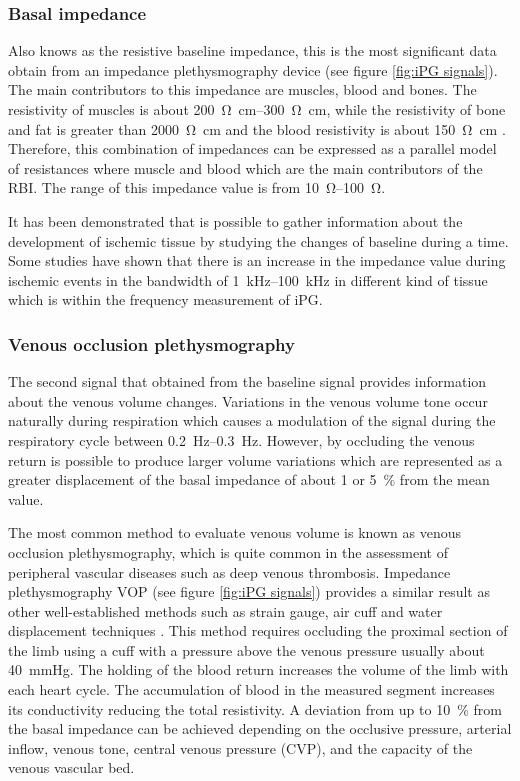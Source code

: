 \subsubsection{Basal impedance}
Also knows as the resistive baseline impedance, this is the most significant data obtain from an impedance plethysmography device (see figure \ref{fig:iPG signals}). The main contributors to this impedance are muscles, blood and bones. The resistivity of muscles is about \SIrange{200}{300}{\ohm\cm}, while the resistivity of bone and fat is greater than \SI{2000}{\ohm\cm} and the blood resistivity is about \SI{150}{\ohm\cm} \cite{gabriel1996dielectric}. Therefore, this combination of impedances can be expressed as a parallel model of resistances where muscle and blood which are the main contributors of the RBI. The range of this impedance value is from \SIrange{10}{100}{\ohm}. 

It has been demonstrated that is possible to gather information about the development of ischemic tissue by studying the changes of baseline during a time. Some studies have shown that there is an increase in the impedance value during ischemic events in the bandwidth of \SIrange{1}{100}{\kilo\hertz} in different kind of tissue \cite{songer2001tissue,casas1999vivo,kun1994tissue,ristic1997muscle} which is within the frequency measurement of iPG. 

\subsubsection{Venous occlusion plethysmography}
The second signal that obtained from the baseline signal provides information about the venous volume changes. Variations in the venous volume tone occur naturally during respiration which causes a modulation of the signal during the respiratory cycle between \SIrange{0.2}{0.3}{\hertz}. However, by occluding the venous return is possible to produce larger volume variations which are represented as a greater displacement of the basal impedance of about \SI{1}{\Omega} or \SI{5}{\percent} from the mean value. 

The most common method to evaluate venous volume is known as venous occlusion plethysmography, which is quite common in the assessment of peripheral vascular diseases such as deep venous thrombosis. Impedance plethysmography VOP (see figure \ref{fig:iPG signals}) provides a similar result as other well-established methods such as strain gauge, air cuff and water displacement techniques . This method requires occluding the proximal section of the limb using a cuff with a pressure above the venous pressure usually about \SI{40}{\mmHg}.  The holding of the blood return increases the volume of the limb with each heart cycle. The accumulation of blood in the measured segment increases its conductivity reducing the total resistivity.  A deviation from up to \SI{10}{\percent} from the basal impedance can be achieved depending on the occlusive pressure, arterial inflow, venous tone, central venous pressure (CVP), and the capacity of the venous vascular bed. 


